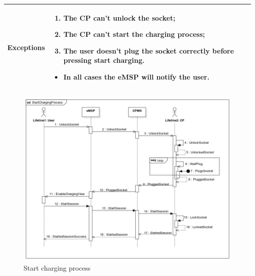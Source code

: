 \documentclass{Configuration_Files/PoliMi3i_thesis}
\begin{document}
\begin{table}[H]
\begin{xltabular}{\textwidth}{| >{}l | X |}
    \hline
    \textbf{Exceptions} & 
    \begin{enumerate}
        \item The CP can’t unlock the socket;
        \item The CP can’t start the charging process;
        \item The user doesn't plug the socket correctly before pressing start charging.
    \end{enumerate}
    \begin{itemize}
        \item In all cases the eMSP will notify the user.
    \end{itemize}\B\\
    \hline
    \end{xltabular}
\end{table}

\begin{figure}[H]
    \centering
    \includegraphics[width=1\textwidth]{Images/UseCases/StartChargingProcess.jpg}
    \caption{Start charging process}
\end{figure}

\end{document}
